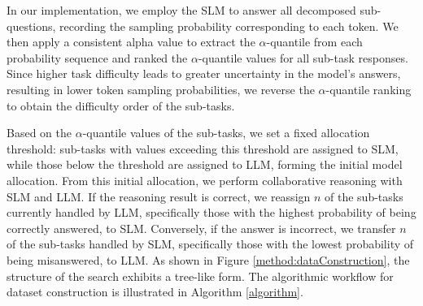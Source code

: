 

In our implementation, we employ the SLM to answer all decomposed sub-questions, recording the sampling probability corresponding to each token. We then apply a consistent alpha value to extract the $\alpha$-quantile from each probability sequence and ranked the $\alpha$-quantile values for all sub-task responses. Since higher task difficulty leads to greater uncertainty in the model’s answers, resulting in lower token sampling probabilities, we reverse the $\alpha$-quantile ranking to obtain the difficulty order of the sub-tasks.

Based on the $\alpha$-quantile values of the sub-tasks, we set a fixed allocation threshold: sub-tasks with values exceeding this threshold are assigned to SLM, while those below the threshold are assigned to LLM, forming the initial model allocation. From this initial allocation, we perform collaborative reasoning with SLM and LLM. If the reasoning result is correct, we reassign $n$ of the sub-tasks currently handled by LLM, specifically those with the highest probability of being correctly answered, to SLM. Conversely, if the answer is incorrect, we transfer $n$ of the sub-tasks handled by SLM, specifically those with the lowest probability of being misanswered, to LLM. 
As shown in Figure \ref{method:dataConstruction}, the structure of the search exhibits a tree-like form.
The algorithmic workflow for dataset construction is illustrated in Algorithm \ref{algorithm}.




